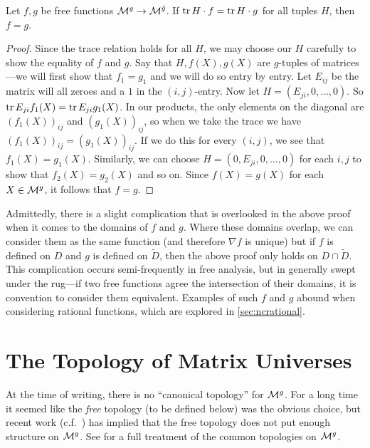\begin{theorem}%
\label{thm:trdual}
Let \(f,g\) be free functions \(\mathcal{M}^{g} \to \mathcal{M}^{\tilde{g}} \). If
\(\operatorname{tr} H \cdot f = \operatorname{tr} H \cdot g\) for all tuples \(H\), then \(f=g\).
\end{theorem}

\begin{proof}
  Since the trace relation holds for all $H$, we may choose our $H$ carefully to
  show the equality of $f$ and $g$. Say that $H,f(X),g(X)$ are $g$-tuples of
  matrices---we will first show that $f_1=g_1$ and we will do so entry by entry.
  Let $E_{ij}$ be the matrix will all zeroes and a \(1\) in the $(i,j)$-entry.  Now
  let $H= (E_{ji},0, \dots ,0)$. So $\operatorname{tr} E_{ji}f_1(X) = \operatorname{tr} E_{ji}g_1(X)$.
  In our products, the only elements on the diagonal are $(f_1(X))_{ij}$ and
  $(g_1(X))_{ij}$, so when we take the trace we have $(f_1(X))_{ij} =(g_1(X))_{ij}$. If we
  do this for every $(i,j)$, we see that $f_1(X)=g_1(X)$. Similarly, we can choose
  \(H = ( 0, E_{ji},0, \dots, 0)\) for each \(i,j\) to show that \(f_2(X)=g_2(X)\) and
  so on. Since \(f(X)=g(X)\) for each \(X \in \mathcal{M}^{g} \), it follows that \(f=g\).
\end{proof}

Admittedly, there is a slight complication that is overlooked in the above proof
when it comes to the domains of \(f\) and \(g\). Where these domains overlap, we
can consider them as the same function (and therefore \(\nabla f \) is unique)
but if \(f\) is defined on \(D\) and \(g\) is defined on \(\tilde{D}\), then the
above proof only holds on \(D \cap \tilde{D}\). This complication  occurs
semi-frequently in free analysis, but in generally swept under the rug---if two
free functions agree the intersection of their domains, it is convention to
consider them equivalent. Examples
of such \(f\) and \(g\) abound when considering rational functions, which are
explored in \cref{sec:ncrational}.

\section{The Topology of Matrix Universes }%
\label{sec:TopManUniv}

At the time of writing, there is no ``canonical topology'' for \(\mathcal{M}^g\). For a
long time it seemed like the \emph{free} topology (to be defined below) was the
obvious choice, but recent work (c.f.\ \cite{pascoeentire2019}) has implied that the free
topology does not put enough structure on \(\mathcal{M}^g\). See \cite{aglerAspects2016}
for a full treatment of the common topologies on \(\mathcal{M}^g\).

